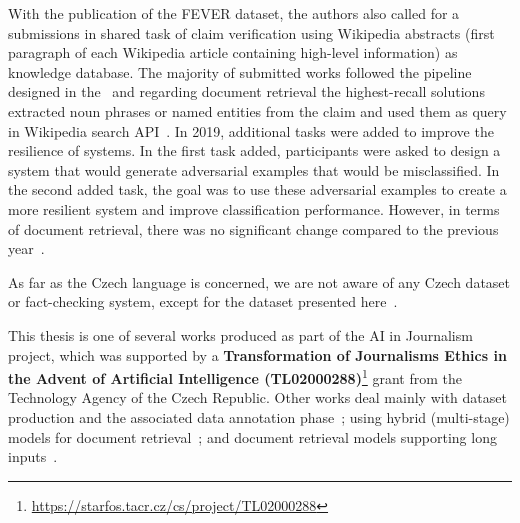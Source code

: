     With the publication of the FEVER dataset, the authors also called for a submissions in shared task of claim verification using Wikipedia abstracts (first paragraph of each Wikipedia article containing high-level information) as knowledge database. The majority of submitted works followed the pipeline designed in the~\parencite{thorne2018fever} and regarding document retrieval the highest-recall solutions extracted noun phrases or named entities from the claim and used them as query in Wikipedia search API~\parencite{hanselowski-etal-2018-ukp, thorne2018fact}. In 2019, additional tasks were added to improve the resilience of systems. In the first task added, participants were asked to design a system that would generate adversarial examples that would be misclassified. In the second added task, the goal was to use these adversarial examples to create a more resilient system and improve classification performance. However, in terms of document retrieval, there was no significant change compared to the previous year~\parencite{thorne-etal-2019-fever2}. 
    
    As far as the Czech language is concerned, we are not aware of any Czech dataset or fact-checking system, except for the dataset presented here~\parencite{priban-etal-2019-machine}. 
    
    This thesis is one of several works produced as part of the AI in Journalism project, which was supported by a \textbf{Transformation of Journalisms Ethics in the Advent of Artificial Intelligence (TL02000288)}\footnote{\url{https://starfos.tacr.cz/cs/project/TL02000288}} grant from the Technology Agency of the Czech Republic. Other works deal mainly with dataset production and the associated data annotation phase~\parencite{herbert-mt}; using hybrid (multi-stage) models for document retrieval~\parencite{bara-mt}; and document retrieval models supporting long inputs~\parencite{alex-mt}.

